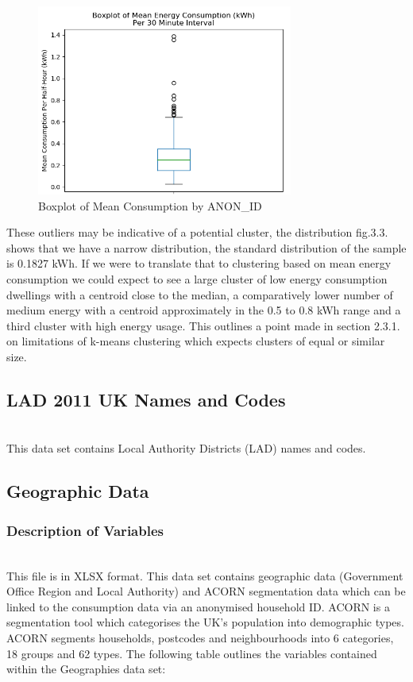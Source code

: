         \begin{figure}[H]
        \centering     
        \includegraphics[width=0.75\textwidth]{Figures/EDA_images/mean_consumption_boxplot.png}
        \caption{Boxplot of Mean Consumption by ANON\_ID}
        \label{fig:Daily Consumption}
        \end{figure}
        
        These outliers may be indicative of a potential cluster, the distribution fig.3.3. shows that we have a narrow distribution, the standard distribution of the sample is 0.1827 kWh. If we were to translate that to clustering based on mean energy consumption we could expect to see a large cluster of low energy consumption dwellings with a centroid close to the median, a comparatively lower number of medium energy with a centroid approximately in the 0.5 to 0.8 kWh range and a third cluster with high energy usage. This outlines a point made in section 2.3.1. on limitations of k-means clustering which expects clusters of equal or similar size.
        
        \subsection{LAD 2011 UK Names and Codes} \\
        This data set contains Local Authority Districts (LAD) names and codes.
        
        \subsection{Geographic Data}
        \subsubsection{Description of Variables}
        \\
        This file is in XLSX format. This data set contains geographic data (Government Office Region and Local Authority) and ACORN segmentation data which can be linked to the consumption data via an anonymised household ID. ACORN is a segmentation tool which categorises the UK's population into demographic types. ACORN segments households, postcodes and neighbourhoods into 6 categories, 18 groups and 62 types. The following table outlines the variables contained within the Geographies data set:
        
